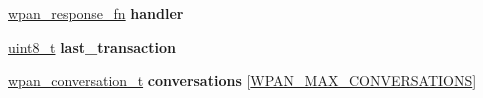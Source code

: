 \begin{DoxyCompactItemize}
\mbox{\label{group__wpan__aps_gabc22a182e7dcbd60a04e8a4eb648aaa2}} 
\hyperlink{group__wpan__aps_gabf0a6b85c9ff3ff9104c8b58c1436d72}{wpan\+\_\+response\+\_\+fn} {\bfseries handler}
\item 
\mbox{\label{group__wpan__aps_ga9e18c6583d7c94f03b10fc1e99187939}} 
\hyperlink{group__hal__dos_gae1affc9ca37cfb624959c866a73f83c2}{uint8\+\_\+t} {\bfseries last\+\_\+transaction}
\item 
\mbox{\label{group__wpan__aps_gaf9565ebe099d08e3f9f26783a4f89826}} 
\hyperlink{structwpan__conversation__t}{wpan\+\_\+conversation\+\_\+t} {\bfseries conversations} \mbox{[}\hyperlink{group__wpan__aps_gae34b1efc8ba99add17fcd767852197d4}{W\+P\+A\+N\+\_\+\+M\+A\+X\+\_\+\+C\+O\+N\+V\+E\+R\+S\+A\+T\+I\+O\+NS}\mbox{]}
\end{DoxyCompactItemize}
